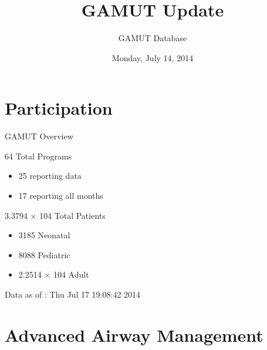 \documentclass[ignorenonframetext,]{beamer}
\title{GAMUT Update}
\author{GAMUT Database}
\date{Monday, July 14, 2014}
\begin{document}
\frame{\titlepage}

\section{Participation}\label{participation}

\begin{frame}{GAMUT Overview}

\begin{block}{64 Total Programs}

\begin{itemize}
\itemsep1pt\parskip0pt
\item
  25 reporting data\\
\item
  17 reporting all months
\end{itemize}

\end{block}

\begin{block}{3.3794 × 104 Total Patients}

\begin{itemize}
\itemsep1pt\parskip0pt
\item
  3185 Neonatal\\
\item
  8088 Pediatric\\
\item
  2.2514 × 104 Adult
\end{itemize}

Data as of : Thu Jul 17 19:08:42 2014

\end{block}

\end{frame}

\section{Advanced Airway Management}\label{advanced-airway-management}
\end{document}
